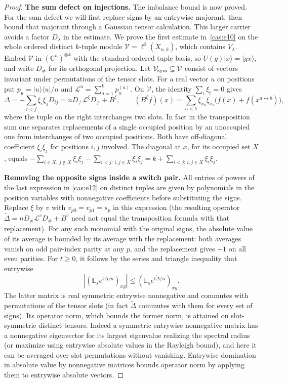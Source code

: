 \begin{proof}
\medskip\noindent\textbf{The sum defect on injections.}\enspace
The imbalance bound is now proved.  For the sum defect we will first
replace signs by an entrywise majorant, then bound that majorant through
a Gaussian tensor calculation.  This larger carrier avoids a factor
$D_\lambda$ in the estimate.
We prove the first estimate in~\eqref{cas:e10} on the whole ordered
distinct $k$-tuple module $\mathcal V=\ell^2(X_{n,k})$, which contains
$V_\lambda$. Embed $\mathcal V$ in $(\mathbb C^n)^{\otimes k}$ with
the standard ordered tuple basis, so $U(g)|x\rangle=|gx\rangle$, and
write $D_{\ne}$ for its orthogonal projection. Let
$\mathcal V_{\rm sym}\subseteq\mathcal V$ consist of vectors invariant
under permutations of the tensor slots. For a real vector $u$ on
positions put $p_u=|u\rangle\langle u|/n$ and
$\mathcal L^u=\sum_{a=1}^k p_u^{(a)}$. On $\mathcal V$, the identity
$\sum_i\xi_i=0$ gives
\begin{equation}
\Delta=-\sum_{i<j}\xi_i\xi_j D_{ij}
=n D_{\ne}\mathcal L^\xi D_{\ne}+ B^\xi,\qquad
(B^\xi f)(x)=\sum_{a<b}\xi_{x_a}\xi_{x_b}\big(f(x)+f(x^{a\leftrightarrow b})\big),
\label{cas:e12}
\end{equation}
where the tuple on the right interchanges two slots. In fact in the transposition sum one separates replacements of a single occupied position by an unoccupied one from interchanges of two occupied positions. Both have off-diagonal coefficient \(\xi_i\xi_j\) for positions \(i,j\) involved. The diagonal at \(x\), for its occupied set \(X\), equals \(-\sum_{i\in X,\,j\notin X}\xi_i\xi_j-\sum_{i<j:\,i,j\in X}\xi_i\xi_j=k+\sum_{i<j:\,i,j\in X}\xi_i\xi_j\).

\medskip\noindent\textbf{Removing the opposite signs inside a switch pair.}\enspace
All entries of powers of the last expression in \eqref{cas:e12} on distinct tuples are given by polynomials in the position variables with nonnegative coefficients before substituting the signs. Replace \(\xi\) by \(v\) with \(v_{p0}=v_{p1}=s_p\) in this expression (the resulting operator \(\widetilde\Delta=nD_{\ne}\mathcal L^vD_{\ne}+B^v\) need not equal the transposition formula with that replacement). For any such monomial with the original signs, the absolute value of its average is bounded by its average with the replacement: both averages vanish on odd pair-index parity at any \(p\), and the replacement gives \(+1\) on all even parities. For \(t\ge0\), it follows by the series and triangle inequality that entrywise
\[
\left|(\mathbb E_s e^{t\Delta/n})_{xy}\right|
\le (\mathbb E_s e^{t\widetilde\Delta/n})_{xy}.
\]
The latter matrix is real symmetric entrywise nonnegative and commutes with permutations of the tensor slots (in fact \(\widetilde\Delta\) commutes with them for every set of signs). Its operator norm, which bounds the former norm, is attained on slot-symmetric distinct tensors. Indeed a symmetric entrywise nonnegative matrix has a nonnegative eigenvector for its largest eigenvalue realizing the spectral radius (or maximize using entrywise absolute values in the Rayleigh bound), and here it can be averaged over slot permutations without vanishing. Entrywise domination in absolute value by nonnegative matrices bounds operator norm by applying them to entrywise absolute vectors.


\end{proof}

